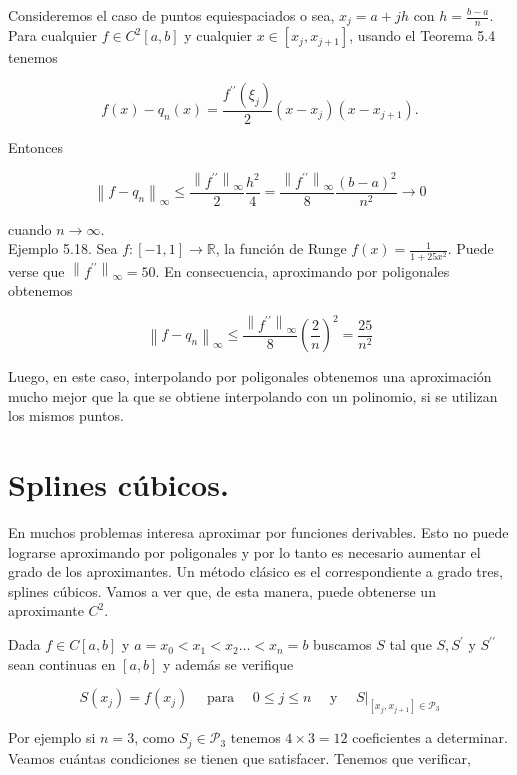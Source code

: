 \documentclass[10pt]{article}
\begin{document}
Consideremos el caso de puntos equiespaciados o sea, $x_{j}=a+j h$ con $h=\frac{b-a}{n}$. Para cualquier $f \in C^{2}[a, b]$ y cualquier $x \in\left[x_{j}, x_{j+1}\right]$, usando el Teorema 5.4 tenemos

$$
f(x)-q_{n}(x)=\frac{f^{\prime \prime}\left(\xi_{j}\right)}{2}\left(x-x_{j}\right)\left(x-x_{j+1}\right) .
$$

Entonces

$$
\left\|f-q_{n}\right\|_{\infty} \leq \frac{\left\|f^{\prime \prime}\right\|_{\infty}}{2} \frac{h^{2}}{4}=\frac{\left\|f^{\prime \prime}\right\|_{\infty}}{8} \frac{(b-a)^{2}}{n^{2}} \rightarrow 0
$$

cuando $n \rightarrow \infty$.\\
Ejemplo 5.18. Sea $f:[-1,1] \rightarrow \mathbb{R}$, la función de Runge $f(x)=\frac{1}{1+25 x^{2}}$. Puede verse que $\left\|f^{\prime \prime}\right\|_{\infty}=50$. En consecuencia, aproximando por poligonales obtenemos

$$
\left\|f-q_{n}\right\|_{\infty} \leq \frac{\left\|f^{\prime \prime}\right\|_{\infty}}{8}\left(\frac{2}{n}\right)^{2}=\frac{25}{n^{2}}
$$

Luego, en este caso, interpolando por poligonales obtenemos una aproximación mucho mejor que la que se obtiene interpolando con un polinomio, si se utilizan los mismos puntos.

\section*{Splines cúbicos.}
En muchos problemas interesa aproximar por funciones derivables. Esto no puede lograrse aproximando por poligonales y por lo tanto es necesario aumentar el grado de los aproximantes. Un método clásico es el correspondiente a grado tres, splines cúbicos. Vamos a ver que, de esta manera, puede obtenerse un aproximante $C^{2}$.

Dada $f \in C[a, b]$ y $a=x_{0}<x_{1}<x_{2} \ldots<x_{n}=b$ buscamos $S$ tal que $S, S^{\prime}$ y $S^{\prime \prime}$ sean continuas en $[a, b]$ y además se verifique

$$
S\left(x_{j}\right)=f\left(x_{j}\right) \quad \text { para } \quad 0 \leq j \leq n \quad \text { y }\left.\quad S\right|_{\left[x_{j}, x_{j+1}\right] \in \mathcal{P}_{3}}
$$

Por ejemplo si $n=3$, como $S_{j} \in \mathcal{P}_{3}$ tenemos $4 \times 3=12$ coeficientes a determinar. Veamos cuántas condiciones se tienen que satisfacer. Tenemos que verificar,
\end{document}
